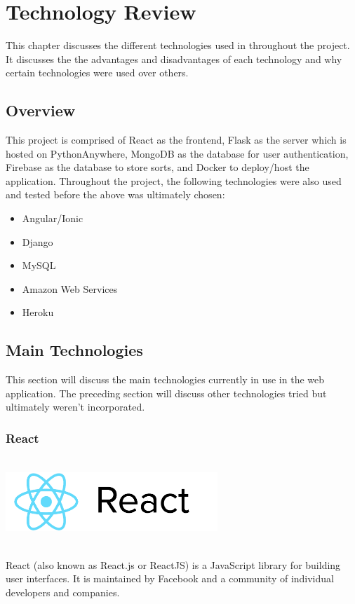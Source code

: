 \chapter{Technology Review}
This chapter discusses the different technologies used in throughout the
project. It discusses the the advantages and disadvantages of each technology 
and why certain technologies were used over others.

\section{Overview}
This project is comprised of React as the frontend, Flask as the server which is
hosted on PythonAnywhere, MongoDB as the database for user authentication, Firebase as the database to store sorts, and Docker to deploy/host the application. Throughout the project, the following technologies were also used 
and tested before the above was ultimately chosen:
\begin{itemize}
    \item Angular/Ionic
    \item Django
    \item MySQL
    \item Amazon Web Services
    \item Heroku
\end{itemize}

\newpage
\section{Main Technologies}
This section will discuss the main technologies currently in use in the web 
application. The preceding section will discuss other technologies tried but 
ultimately weren't incorporated. 

\subsection{React}
\par
\medskip
\begin{center}
    \includegraphics[width=8cm,height=3.3cm,keepaspectratio]{images/react}
\end{center}
React (also known as React.js or ReactJS) is a JavaScript library for building 
user interfaces. It is maintained by Facebook and a community of individual 
developers and companies.

